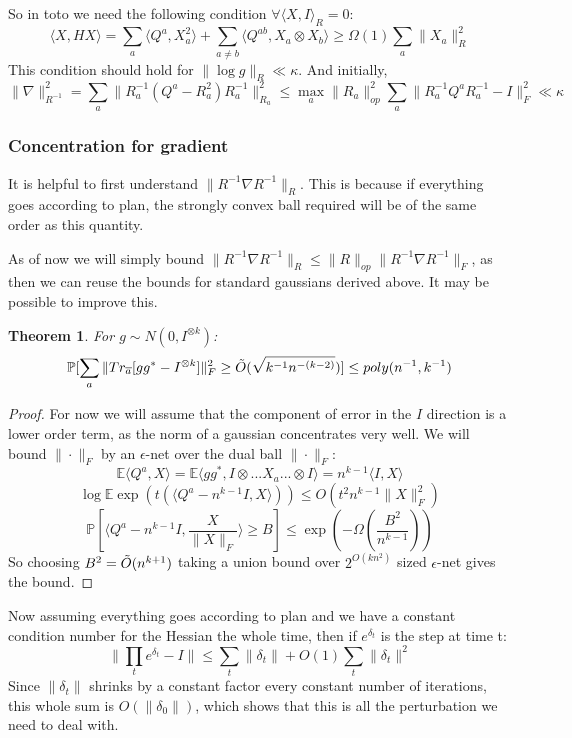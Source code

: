 \documentclass{article}
\newtheorem{theorem}{Theorem}
\newcommand{\E}{\mathbb{E}}
\renewcommand{\Pr}{\mathbb{P}}
\begin{document}
So in toto we need the following condition $\forall \langle X, I \rangle_{R} = 0$:
\[ \langle X, H X \rangle = \sum_{a} \langle Q^{a}, X_{a}^{2} \rangle + \sum_{a \neq b} \langle Q^{ab}, X_{a} \otimes X_{b} \rangle \geq \Omega(1) \sum_{a} \|X_{a}\|_{R}^{2}  \]
This condition should hold for $\|\log g\|_{R} \ll \kappa$. And initially,
\[ \|\nabla\|_{R^{-1}}^{2} = \sum_{a} \|R_{a}^{-1} (Q^{a} - R_{a}^{2}) R_{a}^{-1} \|_{R_{a}}^{2} \leq \max_{a} \|R_{a}\|_{op}^{2} \sum_{a} \|R_{a}^{-1} Q^{a} R_{a}^{-1} - I\|_{F}^{2} \ll \kappa  \]

\subsubsection{Concentration for gradient}
It is helpful to first understand $\|R^{-1} \nabla R^{-1}\|_{R}$. This is because if everything goes according to plan, the strongly convex ball required will be of the same order as this quantity. 

As of now we will simply bound $\|R^{-1} \nabla R^{-1}\|_{R} \leq \|R\|_{op} \|R^{-1} \nabla R^{-1}\|_{F}$, as then we can reuse the bounds for standard gaussians derived above. It may be possible to improve this. 

\begin{theorem}
For $g \sim N(0,I^{\otimes k})$:
\[ \Pr[ \sum_{a} \|Tr_{\overline{a}}[g g^{*} - I^{\otimes k}]\|_{F}^{2} \geq \Tilde{O}(\sqrt{k^{-1} n^{-(k-2)}})] \leq poly(n^{-1},k^{-1})  \]
\end{theorem}
\begin{proof}
For now we will assume that the component of error in the $I$ direction is a lower order term, as the norm of a gaussian concentrates very well. We will bound $\|\cdot\|_{F}$ by an $\epsilon$-net over the dual ball $\|\cdot\|_{F}$:
\[ \E \langle Q^{a}, X \rangle = \E \langle g g^{*}, I \otimes ... X_{a} ... \otimes I \rangle = n^{k-1} \langle I, X \rangle  \]
\[ \log \E \exp( t(\langle Q^{a} - n^{k-1} I, X \rangle)) \leq O \left( t^{2} n^{k-1} \|X\|_{F}^{2} \right)   \]
\[ \Pr[\langle Q^{a} - n^{k-1} I, \frac{X}{\|X\|_{F}} \rangle \geq B] \leq \exp( - \Omega \left( \frac{B^{2}}{n^{k-1}} \right) )  \]
So choosing $B^{2} = \Tilde{O}(n^{k+1})$ taking a union bound over $2^{O(k n^{2})}$ sized $\epsilon$-net gives the bound. 
\end{proof}

Now assuming everything goes according to plan and we have a constant condition number for the Hessian the whole time, then if $e^{\delta_{t}}$ is the step at time t:
\[ \|\prod_{t} e^{\delta_{t}} - I\| \leq \sum_{t} \|\delta_{t}\| + O(1) \sum_{t} \|\delta_{t}\|^{2}   \]
Since $\|\delta_{t}\|$ shrinks by a constant factor every constant number of iterations, this whole sum is $O(\|\delta_{0}\|)$, which shows that this is all the perturbation we need to deal with. 
\end{document}
